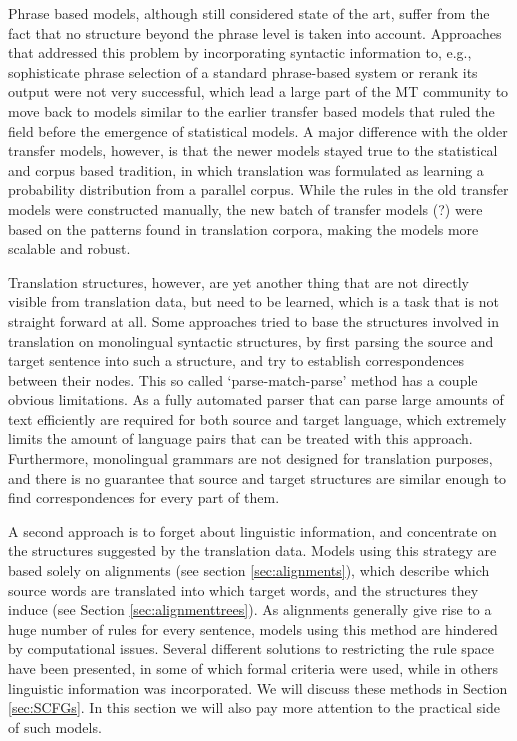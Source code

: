 \documentclass{report}
\theoremstyle{definition}
\theoremstyle{plain}
\begin{document}
Phrase based models, although still considered state of the art, suffer from the fact that no structure beyond the phrase level is taken into account. Approaches that addressed this problem by incorporating syntactic information to, e.g., sophisticate phrase selection of a standard phrase-based system \citep{koehn2003statistical} or rerank its output \citep{och2004alignment} were not very successful, which lead a large part of the MT community to move back to models similar to the earlier transfer based models that ruled the field before the emergence of statistical models. A major difference with the older transfer models, however, is that the newer models stayed true to the statistical and corpus based tradition, in which translation was formulated as learning a probability distribution from a parallel corpus. While the rules in the old transfer models were constructed manually, the new batch of transfer models (?) were based on the patterns found in translation corpora, making the models more scalable and robust.

Translation structures, however, are yet another thing that are not directly visible from translation data, but need to be learned, which is a task that is not straight forward at all. Some approaches tried to base the structures involved in translation on monolingual syntactic structures, by first parsing the source and target sentence into such a structure, and try to establish correspondences between their nodes. This so called `parse-match-parse' method has a couple obvious limitations. As a fully automated parser that can parse large amounts of text efficiently are required for both source and target language, which extremely limits the amount of language pairs that can be treated with this approach. Furthermore, monolingual grammars are not designed for translation purposes, and there is no guarantee that source and target structures are similar enough to find correspondences for every part of them. %

A second approach is to forget about linguistic information, and concentrate on the structures suggested by the translation data. Models using this strategy are based solely on alignments (see section \ref{sec:alignments}), which describe which source words are translated into which target words, and the structures they induce (see Section \ref{sec:alignmenttrees}). As alignments generally give rise to a huge number of rules for every sentence, models using this method are hindered by computational issues. Several different solutions to restricting the rule space have been presented, in some of which formal criteria were used, while in others linguistic information was incorporated. We will discuss these methods in Section \ref{sec:SCFGs}. In this section we will also pay more attention to the practical side of such models.
\end{document}
